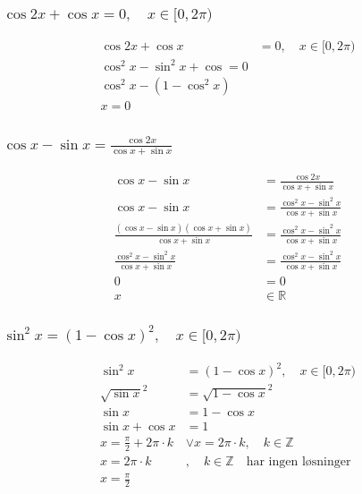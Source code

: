 \documentclass{article}
\begin{document}
\subsubsection{$ \cos 2x + \cos x = 0, \quad x\in[0, 2\pi)$}

\begin{align*}
    \cos 2x + \cos x &= 0, \quad x\in[0, 2\pi) \\
    \cos^2x - \sin^2x + \cos = 0 \\
    \cos^2x - (1-\cos^2x) \\
    x = 0
\end{align*}

\subsubsection{$\cos x - \sin x = \frac{\cos 2x}{\cos x + \sin x}$}

\begin{align*}
    \cos x - \sin x &= \frac{\cos 2x}{\cos x + \sin x} \\
    \cos x - \sin x &= \frac{\cos^2x - \sin^2x}{\cos x + \sin x} \\
    \frac{(\cos x - \sin x)(\cos x + \sin x)}{\cos x + \sin x} &= \frac{\cos^2x - \sin^2x}{\cos x + \sin x} \\
    \frac{\cos^2x - \sin^2x}{\cos x + \sin x} &= \frac{\cos^2x - \sin^2x}{\cos x + \sin x} \\
    0 &= 0 \\
    x &\in \mathbb{R} 
\end{align*}

\subsubsection{$\sin^2x = (1-\cos x)^2, \quad x \in [0, 2\pi)$}

\begin{align*}
    \sin^2x &= (1-\cos x)^2, \quad x \in [0, 2\pi) \\
    \sqrt{\sin x}^2 &= \sqrt{1-\cos x}^2 \\
    \sin x &= 1 - \cos x \\
    \sin x + \cos x &= 1 \\
    x = \frac{\pi}{2} + 2\pi \cdot k & \lor  x = 2\pi \cdot k,\quad k \in \mathbb{Z} \\
    x = 2\pi \cdot k &, \quad k \in \mathbb{Z} \quad \text{har ingen løsninger} \\
    x = \frac{\pi}{2}
\end{align*}
\end{document}

